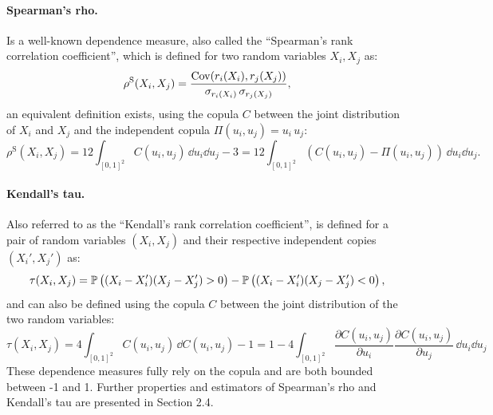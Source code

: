 \paragraph{Spearman's rho.} Is a well-known dependence measure, also called the ``Spearman's rank correlation coefficient'', which is defined for two random variables $X_i, X_j$ as: 
\begin{equation}
    \rho^{\mathrm{S}}(X_i, X_j) = \frac{\cov(r_i(X_i), r_j(X_j))}{\sigma_{r_i(X_i)} \, \sigma_{r_j(X_j)}},
\end{equation}
an equivalent definition exists, using the copula $C$ between the joint distribution of $X_i$ and $X_j$ and the independent copula $\Pi(u_i, u_j) = u_i \, u_j$: 
\begin{equation}
    \rho^{\mathrm{S}}(X_i, X_j) = 12 \int_{[0, 1]^2} C(u_i, u_j) \, \dd u_i \dd u_j - 3 = 12 \int_{[0, 1]^2} (C(u_i, u_j) - \Pi(u_i, u_j)) \, \dd u_i \dd u_j. 
\end{equation}

\paragraph{Kendall's tau.} Also referred to as the ``Kendall's rank correlation coefficient'', is defined for a pair of random variables $(X_i, X_j)$ and their respective independent copies $(X_i', X_j')$ as: 
\begin{equation}
    \tau(X_i, X_j) = \P\left((X_i - X_i')(X_j - X_j') > 0 \right) - \P\left((X_i - X_i')(X_j - X_j') < 0 \right),
\end{equation}
and can also be defined using the copula $C$ between the joint distribution of the two random variables: 
\begin{equation}
    \tau(X_i, X_j) = 4 \int_{[0, 1]^2} C(u_i, u_j) \, \dd C(u_i, u_j) - 1 = 1 - 4 \int_{[0, 1]^2} \frac{\partial C(u_i, u_j)}{\partial u_i} \frac{\partial C(u_i, u_j)}{\partial u_j} \, \dd u_i \dd u_j 
\end{equation}
These dependence measures fully rely on the copula and are both bounded between -1 and 1. 
Further properties and estimators of Spearman's rho and Kendall's tau are presented in \citet{durante_2015_copula} Section 2.4. 


